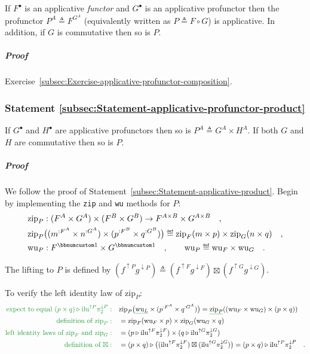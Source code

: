 If $F^{\bullet}$ is an applicative \emph{functor} and $G^{\bullet}$
is an applicative profunctor then the profunctor $P^{A}\triangleq F^{G^{A}}$
(equivalently written as $P\triangleq F\circ G$) is applicative.
In addition, if $G$ is commutative then so is $P$.

\subparagraph{Proof}

Exercise~\ref{subsec:Exercise-applicative-profunctor-composition}.

\subsubsection{Statement \label{subsec:Statement-applicative-profunctor-product}\ref{subsec:Statement-applicative-profunctor-product}}

If $G^{\bullet}$ and $H^{\bullet}$ are applicative profunctors then
so is $P^{A}\triangleq G^{A}\times H^{A}$. If both $G$ and $H$
are commutative then so is $P$.

\subparagraph{Proof}

We follow the proof of Statement~\ref{subsec:Statement-applicative-product}.
Begin by implementing the \lstinline!zip! and \lstinline!wu! methods
for $P$:
\begin{align*}
 & \text{zip}_{P}:(F^{A}\times G^{A})\times(F^{B}\times G^{B})\rightarrow F^{A\times B}\times G^{A\times B}\quad,\\
 & \text{zip}_{P}\big((m^{:F^{A}}\times n^{:G^{A}})\times(p^{:F^{B}}\times q^{:G^{B}})\big)\triangleq\text{zip}_{F}(m\times p)\times\text{zip}_{G}(n\times q)\quad,\\
 & \text{wu}_{P}:F^{\bbnum 1}\times G^{\bbnum 1}\quad,\quad\quad\text{wu}_{P}\triangleq\text{wu}_{F}\times\text{wu}_{G}\quad.
\end{align*}

The lifting to $P$ is defined by $(f^{\uparrow P}g^{\downarrow P})\triangleq(f^{\uparrow F}g^{\downarrow F})\boxtimes(f^{\uparrow G}g^{\downarrow G})$.

To verify the left identity law of $\text{zip}_{P}$:
\begin{align*}
{\color{greenunder}\text{expect to equal }(p\times q)\triangleright\text{ilu}^{\uparrow P}\pi_{2}^{\downarrow P}:}\quad & \text{zip}_{P}\big(\gunderline{\text{wu}_{L}}\times(p^{:F^{A}}\times q^{:G^{A}})\big)=\gunderline{\text{zip}_{P}}((\text{wu}_{F}\times\text{wu}_{G})\times(p\times q))\\
{\color{greenunder}\text{definition of }\text{zip}_{P}:}\quad & =\text{zip}_{F}(\text{wu}_{F}\times p)\times\text{zip}_{G}(\text{wu}_{G}\times q)\\
{\color{greenunder}\text{left identity laws of }\text{zip}_{F}\text{ and }\text{zip}_{G}:}\quad & =(p\triangleright\text{ilu}^{\uparrow F}\pi_{2}^{\downarrow F})\times(q\triangleright\text{ilu}^{\uparrow G}\pi_{2}^{\downarrow G})\\
{\color{greenunder}\text{definition of }\boxtimes:}\quad & =(p\times q)\triangleright\big((\text{ilu}^{\uparrow F}\pi_{2}^{\downarrow F})\boxtimes(\text{ilu}^{\uparrow G}\pi_{2}^{\downarrow G})\big)=(p\times q)\triangleright\text{ilu}^{\uparrow P}\pi_{2}^{\downarrow P}\quad.
\end{align*}

